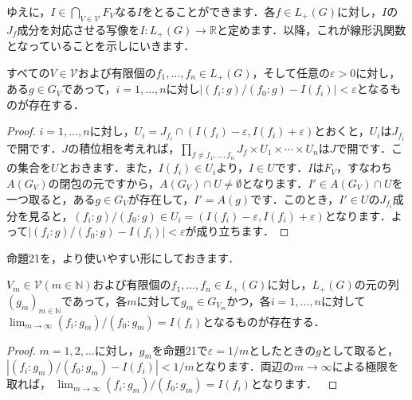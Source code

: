 ゆえに，$I \in \bigcap_{V \in \mathscr{V}}F_V$なる$I$をとることができます．各$f \in L_{+}(G)$に対し，$I$の$J_f$成分を対応させる写像を$I \colon L_{+}(G) \to \mathbb{R}$と定めます．以降，これが線形汎関数となっていることを示しにいきます．
\begin{prop}
すべての$V \in \mathscr{V}$および有限個の$f_1, \ldots , f_n \in L_{+}(G)$，そして任意の$\varepsilon > 0$に対し，ある$g \in G_V$であって，$i=1, \ldots , n$に対し$|(f_i \colon g ) / ( f_0 \colon g ) -I(f_i) | < \varepsilon$となるものが存在する．
\end{prop}
\begin{proof}
$i=1, \ldots , n$に対し，$U_i=J_{f_i} \cap ( I(f_i)- \varepsilon, I(f_i)+\varepsilon )$とおくと，$U_i$は$J_{f_i}$で開です．$J$の積位相を考えれば，$\prod_{f \neq f_1, \ldots , f_n}J_f \times U_1 \times \cdots \times U_n$は$J$で開です．この集合を$U$とおきます．また，$I(f_i) \in U_i$より，$I \in U$です．$I$は$F_V$，すなわち$A(G_V)$の閉包の元ですから，$A(G_V) \cap U \neq \emptyset$となります．$I' \in A(G_V) \cap U$を一つ取ると，ある$g \in G_V$が存在して，$I'=A(g)$です．このとき，$I' \in U$の$J_{f_i}$成分を見ると，$(f_i \colon g ) / ( f_0 \colon g ) \in U_i = ( I(f_i)- \varepsilon, I(f_i)+\varepsilon )$となります．よって$|(f_i \colon g ) / ( f_0 \colon g ) -I(f_i) | < \varepsilon$が成り立ちます．
\end{proof}
命題21を，より使いやすい形にしておきます．

\begin{cor}
$V_m \in \mathscr{V}(m \in \mathbb{N})$および有限個の$f_1, \ldots , f_n \in L_{+}(G)$に対し，$L_{+}(G)$の元の列$(g_m)_{m \in \mathbb{N}}$であって，各$m$に対して$g_m \in G_{V_m}$かつ，各$i=1, \ldots , n$に対して $\lim_{m \to \infty} (f_i \colon g_m ) / ( f_0 \colon g_m ) =I(f_i)$となるものが存在する．
\end{cor}
\begin{proof}
$m=1,2, \ldots$に対し，$g_m$を命題21で$\varepsilon = 1/m$としたときの$g$として取ると，$|(f_i \colon g_m ) / ( f_0 \colon g_m ) -I(f_i) | < 1/m$となります．両辺の$m \to \infty$による極限を取れば， $\lim_{m \to \infty} (f_i \colon g_m ) / ( f_0 \colon g_m ) =I(f_i)$となります．　
\end{proof}

